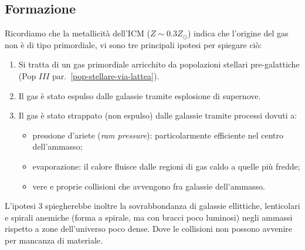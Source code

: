 \subsection{Formazione}
Ricordiamo che la metallicità dell'ICM ($Z\sim 0.3 Z_{\odot}$) indica che l'origine del gas non è di tipo primordiale, vi sono tre principali ipotesi per spiegare ciò:

\begin{enumerate}
    \item Si tratta di un gas primordiale arricchito da popolazioni stellari pre-galattiche (Pop $III$ par.~\ref{pop-stellare-via-lattea}).
    \item Il gas è stato espulso dalle galassie tramite esplosione di supernove.
    \item Il gas è stato strappato (non espulso) dalle galassie tramite processi dovuti a:
    \begin{itemize}
        \item pressione d'ariete (\emph{ram pressure}): particolarmente efficiente nel centro dell'ammasso;
        \item evaporazione: il calore fluisce dalle regioni di gas caldo a quelle più fredde;
        \item vere e proprie collisioni che avvengono fra galassie dell'ammasso.
    \end{itemize}
\end{enumerate}

L'ipotesi $3$ spiegherebbe inoltre la sovrabbondanza di galassie ellittiche, lenticolari e spirali anemiche (forma a spirale, ma con bracci poco luminosi) negli ammassi rispetto a zone dell'universo poco dense. Dove le collisioni non possono avvenire per mancanza di materiale.

